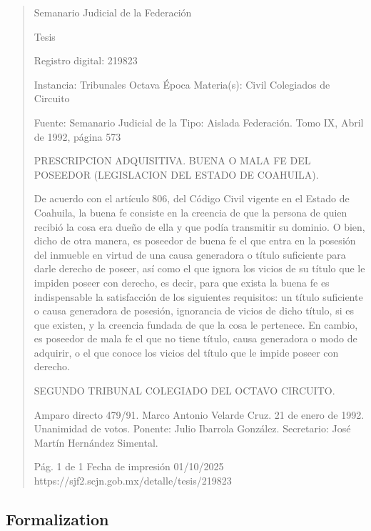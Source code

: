 \documentclass[11pt,a4paper]{article}
\begin{document}
\begin{quote}
                                                   Semanario Judicial de la Federación

                                                  Tesis

 Registro digital: 219823

 Instancia: Tribunales            Octava Época                         Materia(s): Civil
 Colegiados de Circuito

                                  Fuente: Semanario Judicial de la   Tipo: Aislada
                                  Federación.
                                  Tomo IX, Abril de 1992, página 573


PRESCRIPCION ADQUISITIVA. BUENA O MALA FE DEL POSEEDOR (LEGISLACION DEL
ESTADO DE COAHUILA).


De acuerdo con el artículo 806, del Código Civil vigente en el Estado de Coahuila, la buena fe
consiste en la creencia de que la persona de quien recibió la cosa era dueño de ella y que podía
transmitir su dominio. O bien, dicho de otra manera, es poseedor de buena fe el que entra en la
posesión del inmueble en virtud de una causa generadora o título suficiente para darle derecho de
poseer, así como el que ignora los vicios de su título que le impiden poseer con derecho, es decir,
para que exista la buena fe es indispensable la satisfacción de los siguientes requisitos: un título
suficiente o causa generadora de posesión, ignorancia de vicios de dicho título, si es que existen, y
la creencia fundada de que la cosa le pertenece. En cambio, es poseedor de mala fe el que no tiene
título, causa generadora o modo de adquirir, o el que conoce los vicios del título que le impide
poseer con derecho.

SEGUNDO TRIBUNAL COLEGIADO DEL OCTAVO CIRCUITO.


Amparo directo 479/91. Marco Antonio Velarde Cruz. 21 de enero de 1992. Unanimidad de votos.
Ponente: Julio Ibarrola González. Secretario: José Martín Hernández Simental.




                                             Pág. 1 de 1            Fecha de impresión 01/10/2025
  https://sjf2.scjn.gob.mx/detalle/tesis/219823

\end{quote}

\subsection{Formalization}
\end{document}
